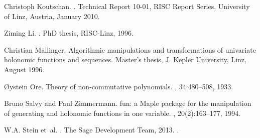 \documentclass{llncs}
\begin{document}
\begin{thebibliography}{10}
Christoph Koutschan.
.
\newblock Technical Report 10-01, RISC Report Series, University of Linz,
  Austria, January 2010.

Ziming Li.
.
\newblock PhD thesis, RISC-Linz, 1996.

Christian Mallinger.
\newblock Algorithmic manipulations and transformations of univariate holonomic
  functions and sequences.
\newblock Master's thesis, J. Kepler University, Linz, August 1996.

{\O}ystein Ore.
\newblock Theory of non-commutative polynomials.
, 34:480--508, 1933.

Bruno Salvy and Paul Zimmermann.
fun: a {M}aple package for the manipulation of generating and
  holonomic functions in one variable.
, 20(2):163--177,
  1994.

W.\thinspace{}A. Stein et~al.
.
\newblock The Sage Development Team, 2013.
.

\end{thebibliography}

 
\end{document}
